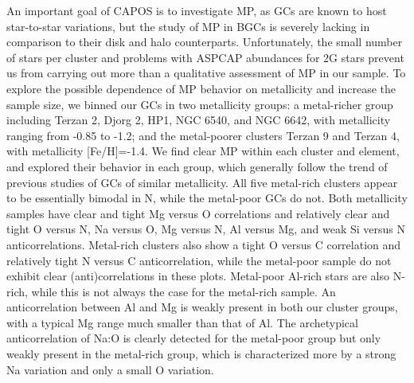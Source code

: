 \documentclass[onecolumn]{aa}
\begin{document}
An important goal of CAPOS is to investigate MP, as GCs are known to host star-to-star variations, but the study of MP in BGCs is severely lacking in comparison to their disk and  halo counterparts.
Unfortunately, the small number of stars per cluster and problems with ASPCAP abundances for 2G stars prevent us from carrying out more than a qualitative assessment of MP in our sample.
To explore the possible dependence of MP behavior on metallicity and increase the sample size, we binned our GCs in two metallicity groups: a metal-richer group 
including  Terzan 2, Djorg 2, HP1, NGC 6540, and NGC 6642, 
with metallicity ranging from -0.85 to -1.2; and the metal-poorer clusters Terzan 9 and Terzan 4, with  metallicity [Fe/H]=-1.4. 
We find clear MP within each cluster and element, and explored their behavior in each group, which generally follow the trend of previous studies of GCs of similar metallicity. 
All five metal-rich clusters appear to be essentially bimodal in N, while the metal-poor GCs do not. Both metallicity samples have clear and tight Mg versus O correlations and relatively clear and tight O versus N, Na versus O, Mg versus N, Al versus Mg, and weak Si versus N anticorrelations. Metal-rich clusters also show a tight O versus C correlation and relatively tight N versus C anticorrelation, while the metal-poor sample do not exhibit clear (anti)correlations in these plots.  Metal-poor Al-rich stars are also N-rich, while this is not always the case for the metal-rich sample. An anticorrelation between Al and Mg is weakly present in both our
cluster groups, with a typical Mg range much smaller than that of Al.
The archetypical anticorrelation of Na:O is clearly detected for the metal-poor group but only weakly present in the metal-rich group, which is characterized more by a strong Na variation and only a small O variation. %
\end{document}
